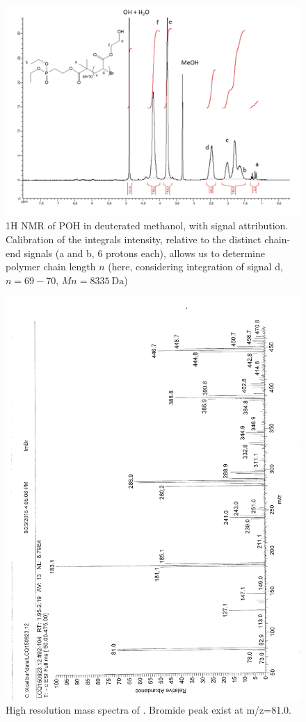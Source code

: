 \documentclass[journal=jacsat,manuscript=article]{achemso}
\begin{document}
\begin{figure}
\includegraphics[width=\textwidth]{POH_1H_NMR.png}
\caption{1H NMR of POH in deuterated methanol, with signal attribution. Calibration of the integrals intensity, relative to the distinct chain-end signals (a and b, 6 protons each), allows us to determine polymer chain length $n$ (here, considering integration of signal d,  $n=69-70$, $Mn=\SI{8335}{\dalton}$)}
\end{figure}

\begin{figure}
\includegraphics[height=\textheight-2\baselineskip]{mass_PImBr.png}
\caption{High resolution mass spectra of . Bromide peak exist at m/z=81.0.}
\label{fig:massPImBr}
\end{figure}
\end{document}
